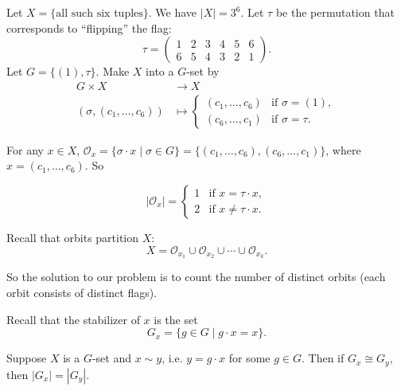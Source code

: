 Let $X=\{\text{all such six tuples}\}$. We have $|X|=3^6$. Let $\tau$ be the permutation that corresponds to ``flipping'' the flag:
$$\tau=\begin{pmatrix}
	1 & 2 & 3 & 4 & 5 & 6\\
	6 & 5 & 4 & 3 & 2 & 1
\end{pmatrix}.$$
Let $G=\{(1),\tau\}$. Make $X$ into a $G$-set
 by
\begin{align*}
	G\times X &\to X\\
	(\sigma,(c_1,\hdots,c_6)) &\mapsto\begin{cases}
		(c_1,\hdots,c_6) & \text{if $\sigma=(1)$},\\
		(c_6,\hdots,c_1) & \text{if $\sigma=\tau$}.
	\end{cases}
\end{align*}

For any $x\in X$, $\mathcal O_x=\{\sigma\cdot x\mid\sigma\in G\}=\{(c_1,\hdots,c_6),(c_6,\hdots,c_1)\}$, where $x=(c_1,\hdots,c_6)$. So

$$|\mathcal O_x|=\begin{cases}
	1 & \text{if $x=\tau\cdot x$},\\
	2 & \text{if $x\neq\tau\cdot x$}.
\end{cases}$$

Recall that orbits partition $X$:
$$X=\mathcal O_{x_1}\cup\mathcal O_{x_2}\cup\cdots\cup\mathcal O_{x_k}.$$

So the solution to our problem is to count the number of distinct orbits (each orbit consists of distinct flags).

Recall that the stabilizer of $x$ is the set
$$G_x=\{g\in G\mid g\cdot x=x\}.$$

\begin{lemma}\label{lem:burn_lem}
	Suppose $X$ is a $G$-set and $x\sim y$, i.e. $y=g\cdot x$ for some $g\in G$. Then if $G_x\cong G_y$, then $|G_x|=|G_y|$.
\end{lemma}

